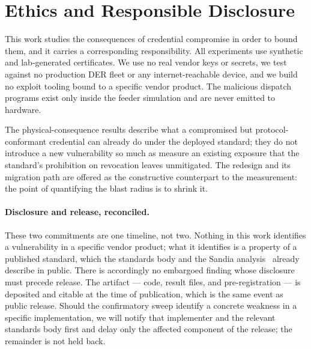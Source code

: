 \section{Ethics and Responsible Disclosure}

This work studies the consequences of credential compromise in order to bound them, and it
carries a corresponding responsibility. All experiments use synthetic and lab-generated
certificates. We use no real vendor keys or secrets, we test against no production DER fleet
or any internet-reachable device, and we build no exploit tooling bound to a specific vendor
product. The malicious dispatch programs exist only inside the feeder simulation and are
never emitted to hardware.

The physical-consequence results describe what a compromised but protocol-conformant
credential can already do under the deployed standard; they do not introduce a new
vulnerability so much as measure an existing exposure that the standard's prohibition on
revocation leaves unmitigated. The redesign and its migration path are offered as the constructive
counterpart to the measurement: the point of quantifying the blast radius is to shrink it.

\paragraph{Disclosure and release, reconciled.} These two commitments are one timeline, not two.
Nothing in this work identifies a vulnerability in a specific vendor product; what it identifies is
a property of a published standard, which the standards body and the Sandia
analysis~\cite{obert2019recommendations} already describe in public. There is accordingly no
embargoed finding whose disclosure must precede release. The artifact --- code, result files, and
pre-registration --- is deposited and citable at the time of publication, which is the same event
as public release. Should the confirmatory sweep identify a concrete weakness in a specific
implementation, we will notify that implementer and the relevant standards body first and delay
only the affected component of the release; the remainder is not held back.
